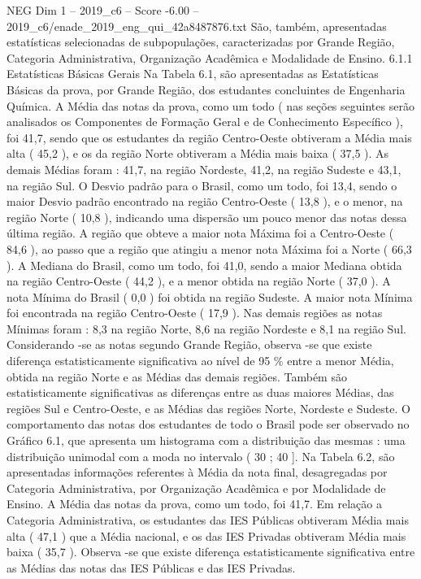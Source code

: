 \begin{textsample}{NEG Dim 1 – 2019\_c6 – Score -6.00 – 2019\_c6/enade\_2019\_eng\_qui\_42a8487876.txt}
São, também, apresentadas estatísticas selecionadas de subpopulações, caracterizadas por Grande Região, Categoria Administrativa, Organização Acadêmica e Modalidade de Ensino. 6.1.1 Estatísticas Básicas Gerais Na Tabela 6.1, são apresentadas as Estatísticas Básicas da prova, por Grande Região, dos estudantes concluintes de Engenharia Química.
A Média das notas da prova, como um todo ( nas seções seguintes serão analisados os Componentes de Formação Geral e de Conhecimento Específico ), foi 41,7, sendo que os estudantes da região Centro-Oeste obtiveram a Média mais alta ( 45,2 ), e os da região Norte obtiveram a Média mais baixa ( 37,5 ).
As demais Médias foram : 41,7, na região Nordeste, 41,2, na região Sudeste e 43,1, na região Sul.
O Desvio padrão para o Brasil, como um todo, foi 13,4, sendo o maior Desvio padrão encontrado na região Centro-Oeste ( 13,8 ), e o menor, na região Norte ( 10,8 ), indicando uma dispersão um pouco menor das notas dessa última região.
A região que obteve a maior nota Máxima foi a Centro-Oeste ( 84,6 ), ao passo que a região que atingiu a menor nota Máxima foi a Norte ( 66,3 ).
A Mediana do Brasil, como um todo, foi 41,0, sendo a maior Mediana obtida na região Centro-Oeste ( 44,2 ), e a menor obtida na região Norte ( 37,0 ).
A nota Mínima do Brasil ( 0,0 ) foi obtida na região Sudeste.
A maior nota Mínima foi encontrada na região Centro-Oeste ( 17,9 ).
Nas demais regiões as notas Mínimas foram : 8,3 na região Norte, 8,6 na região Nordeste e 8,1 na região Sul.
Considerando -se as notas segundo Grande Região, observa -se que existe diferença estatisticamente significativa ao nível de 95 \% entre a menor Média, obtida na região Norte e as Médias das demais regiões.
Também são estatisticamente significativas as diferenças entre as duas maiores Médias, das regiões Sul e Centro-Oeste, e as Médias das regiões Norte, Nordeste e Sudeste.
O comportamento das notas dos estudantes de todo o Brasil pode ser observado no Gráfico 6.1, que apresenta um histograma com a distribuição das mesmas : uma distribuição unimodal com a moda no intervalo ( 30 ; 40 ].
Na Tabela 6.2, são apresentadas informações referentes à Média da nota final, desagregadas por Categoria Administrativa, por Organização Acadêmica e por Modalidade de Ensino.
A Média das notas da prova, como um todo, foi 41,7.
Em relação a Categoria Administrativa, os estudantes das IES Públicas obtiveram Média mais alta ( 47,1 ) que a Média nacional, e os das IES Privadas obtiveram Média mais baixa ( 35,7 ).
Observa -se que existe diferença estatisticamente significativa entre as Médias das notas das IES Públicas e das IES Privadas.

\end{textsample}
